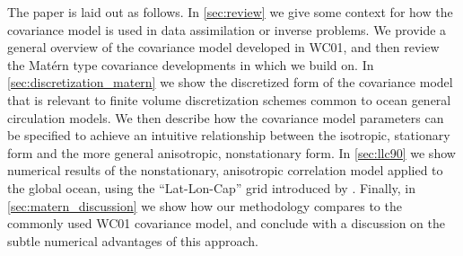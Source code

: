 The paper is laid out as follows.
In \cref{sec:review} we give some context for how the covariance model is
used in data assimilation or inverse problems.
We provide a general overview of the covariance model developed in WC01, and
then review the Mat\'ern type covariance developments in \citet{RSSB:RSSB777}
which we build on.
In \cref{sec:discretization_matern} we show the discretized form of the covariance model
that is relevant to finite volume discretization schemes common to ocean
general circulation models.
We then describe how the covariance model parameters can be specified to achieve
an intuitive relationship between the isotropic, stationary form and the more
general anisotropic, nonstationary form.
In \cref{sec:llc90} we show numerical results of the nonstationary, anisotropic
correlation model applied to the global ocean, using the ``Lat-Lon-Cap''
grid introduced by \citet{forgetECCOv4}.
Finally, in \cref{sec:matern_discussion} we show how our methodology compares to the
commonly used WC01 covariance model, and conclude with a discussion on the subtle numerical
advantages of this approach.
